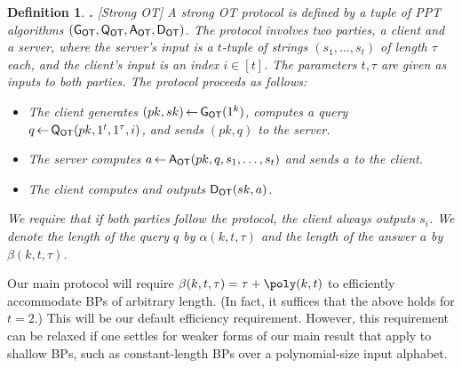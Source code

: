\documentclass{article}
\newcommand{\genot}{{\sf G_{OT}}}
\newcommand{\queot}{{\sf Q_{OT}}}
\newcommand{\ansot}{{\sf A_{OT}}}
\newcommand{\decot}{{\sf D_{OT}}}
\newcommand{\otl}{{\tau}}
\newtheorem{DEFINITION}{Definition}[section]
\newenvironment{definition}{\begin{DEFINITION} \hspace{-.85em} {\bf .} \rm}%
	{\end{DEFINITION}}
\newcommand{\from}{{\,\leftarrow\,}}
\newcommand{\samp}[2]{#1\from #2}
\begin{document}
\begin{definition}[Strong OT]
\label{def-ot} A {\em strong OT} protocol is defined by a tuple of
PPT algorithms $(\genot,\queot,\ansot,\decot)$. The protocol
involves two parties, a client and a server, where the server's
input is a $t$-tuple of strings $(s_1,\ldots,s_t)$ of length $\otl$
each, and the client's input is an index $i\in[t]$. The parameters
$t,\otl$ are given as inputs to both parties. The protocol proceeds
as follows:
\begin{itemize}
\item The client generates $\samp{(pk,sk)}{\genot(1^k)}$, computes a
query $\samp{q}{\queot(pk,1^t,1^\otl,i)}$, and sends $(pk,q)$ to the
server.
\item  The server computes $\samp{a}{\ansot(pk,q,s_1,\ldots,s_t)}$
and sends $a$ to the client.
\item  The client computes and outputs $\decot(sk,a)$.
\end{itemize}
We require that if both parties follow the protocol, the client
always outputs $s_i$. We denote the length of the query $q$ by
$\alpha(k,t,\otl)$ and the length of the answer $a$ by
$\beta(k,t,\otl)$.
\end{definition}
Our main protocol will require $\beta(k,t,\otl)=\otl+\poly(k,t)$ to
efficiently accommodate BPs of arbitrary length. (In fact, it
suffices that the above holds for $t=2$.) This will be our default
efficiency requirement. However, this requirement can be relaxed if
one settles for weaker forms of our main result that apply to
shallow BPs, such as constant-length BPs over a polynomial-size
input alphabet.
\end{document}

